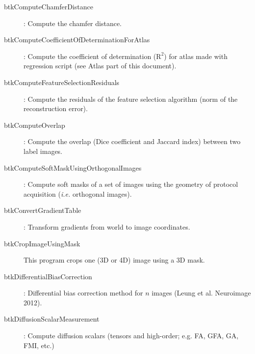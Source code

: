 \begin{description}
\item[btkComputeChamferDistance]: Compute the chamfer distance.
\item[btkComputeCoefficientOfDeterminationForAtlas]: Compute the coefficient of determination ($\text{R}^2$) for atlas made with regression script (see Atlas part of this document).
\item[btkComputeFeatureSelectionResiduals]: Compute the residuals of the feature selection algorithm (norm of the reconstruction error).
\item[btkComputeOverlap]: Compute the overlap (Dice coefficient and Jaccard index) between two label images.
\item[btkComputeSoftMaskUsingOrthogonalImages]: Compute soft masks of a set of images using the geometry of protocol acquisition (\textit{i.e.} orthogonal images).
\item[btkConvertGradientTable]: Transform gradients from world to image coordinates.
\item[btkCropImageUsingMask] This program crops one (3D or 4D) image using a 3D mask.
\item[btkDifferentialBiasCorrection]: Differential bias correction method for $n$ images (Leung et al. Neuroimage 2012). 
\item[btkDiffusionScalarMeasurement]: Compute diffusion scalars (tensors and high-order; e.g. FA, GFA, GA, FMI, etc.)

\end{description}
